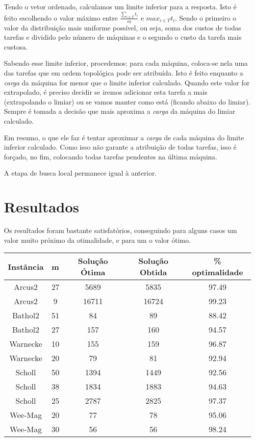\documentclass{report}
\begin{document}
Tendo o vetor ordenado, calculamos um limite inferior para a
resposta. Isto é feito escolhendo o valor máximo entre $\frac{\sum_{i\in T}t_i}{m}$
 e $max_{i\in T}t_i$. Sendo o primeiro
o valor da distribuição mais uniforme possível, ou seja,
soma dos custos de todas tarefas e dividido pelo
número de máquinas e o segundo o custo da tarefa mais custosa.

Sabendo esse limite inferior, procedemos: para cada máquina, coloca-se
nela uma das tarefas que em ordem topológica pode ser atribuída.
Isto é feito enquanto a \emph{carga}
da máquina for menor que o limite inferior
calculado. Quando este valor for extrapolado, é preciso decidir se iremos
adicionar esta tarefa a mais
(extrapolando o limiar) ou se vamos manter como está (ficando abaixo do limiar).
Sempre é tomada a decisão que mais
aproxima a \emph{carga} da máquina do limiar calculado.

Em resumo, o que ele faz é tentar aproximar a \emph{carga} de
cada máquina do limite inferior calculado.
Como isso não garante a atribuição de todas tarefas, isso é forçado, no fim,
colocando todas tarefas pendentes na última máquina.

A etapa de busca local permanece igual à anterior.

\chapter{Resultados}

Os resultados foram bastante satisfatórios, conseguindo para alguns casos um
valor muito próximo da otimalidade, e para um o valor ótimo.

\begin{table}[htbp]
 \begin{tabular}{|c|c|c|c|c|}
  \hline
  \textbf{Instância} & \textbf{m} & \textbf{Solução Ótima} & \textbf{Solução Obtida} & \% optimalidade \\
  \hline
  Arcus2 & 27 & 5689 & 5835 & 97.49 \\
  \hline
  Arcus2 & 9 & 16711 & 16724 & 99.23 \\
  \hline
  Bathol2 & 51 & 84 & 89 & 88.42 \\
  \hline
  Bathol2 & 27 & 157 & 160 & 94.57 \\
  \hline
  Warnecke & 10 & 155 & 159 & 96.87 \\
  \hline
  Warnecke & 20 & 79 & 81 & 92.94 \\
  \hline
  Scholl & 50 & 1394 & 1449 & 92.56 \\
  \hline
  Scholl & 38 & 1834 & 1883 & 94.63 \\
  \hline
  Scholl & 25 & 2787 & 2825 & 97.37 \\
  \hline
  Wee-Mag & 20 & 77 & 78 & 95.06 \\
  \hline
  Wee-Mag & 30 & 56 & 56 & 98.24 \\
  \hline
 \end{tabular}
\end{table}
\end{document}
